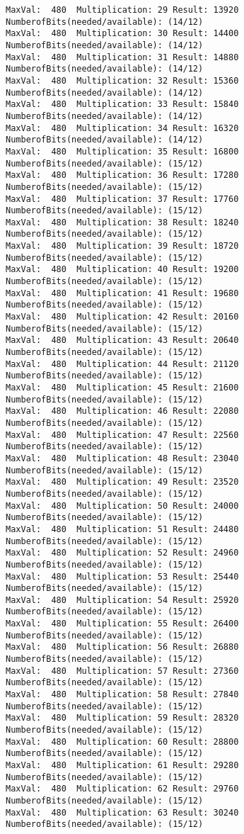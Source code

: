 \documentclass{article}
\begin{document}
\begin{Verbatim}[commandchars=\\\{\}]
MaxVal:  480  Multiplication: 29 Result: 13920 NumberofBits(needed/available): (14/12)
MaxVal:  480  Multiplication: 30 Result: 14400 NumberofBits(needed/available): (14/12)
MaxVal:  480  Multiplication: 31 Result: 14880 NumberofBits(needed/available): (14/12)
MaxVal:  480  Multiplication: 32 Result: 15360 NumberofBits(needed/available): (14/12)
MaxVal:  480  Multiplication: 33 Result: 15840 NumberofBits(needed/available): (14/12)
MaxVal:  480  Multiplication: 34 Result: 16320 NumberofBits(needed/available): (14/12)
MaxVal:  480  Multiplication: 35 Result: 16800 NumberofBits(needed/available): (15/12)
MaxVal:  480  Multiplication: 36 Result: 17280 NumberofBits(needed/available): (15/12)
MaxVal:  480  Multiplication: 37 Result: 17760 NumberofBits(needed/available): (15/12)
MaxVal:  480  Multiplication: 38 Result: 18240 NumberofBits(needed/available): (15/12)
MaxVal:  480  Multiplication: 39 Result: 18720 NumberofBits(needed/available): (15/12)
MaxVal:  480  Multiplication: 40 Result: 19200 NumberofBits(needed/available): (15/12)
MaxVal:  480  Multiplication: 41 Result: 19680 NumberofBits(needed/available): (15/12)
MaxVal:  480  Multiplication: 42 Result: 20160 NumberofBits(needed/available): (15/12)
MaxVal:  480  Multiplication: 43 Result: 20640 NumberofBits(needed/available): (15/12)
MaxVal:  480  Multiplication: 44 Result: 21120 NumberofBits(needed/available): (15/12)
MaxVal:  480  Multiplication: 45 Result: 21600 NumberofBits(needed/available): (15/12)
MaxVal:  480  Multiplication: 46 Result: 22080 NumberofBits(needed/available): (15/12)
MaxVal:  480  Multiplication: 47 Result: 22560 NumberofBits(needed/available): (15/12)
MaxVal:  480  Multiplication: 48 Result: 23040 NumberofBits(needed/available): (15/12)
MaxVal:  480  Multiplication: 49 Result: 23520 NumberofBits(needed/available): (15/12)
MaxVal:  480  Multiplication: 50 Result: 24000 NumberofBits(needed/available): (15/12)
MaxVal:  480  Multiplication: 51 Result: 24480 NumberofBits(needed/available): (15/12)
MaxVal:  480  Multiplication: 52 Result: 24960 NumberofBits(needed/available): (15/12)
MaxVal:  480  Multiplication: 53 Result: 25440 NumberofBits(needed/available): (15/12)
MaxVal:  480  Multiplication: 54 Result: 25920 NumberofBits(needed/available): (15/12)
MaxVal:  480  Multiplication: 55 Result: 26400 NumberofBits(needed/available): (15/12)
MaxVal:  480  Multiplication: 56 Result: 26880 NumberofBits(needed/available): (15/12)
MaxVal:  480  Multiplication: 57 Result: 27360 NumberofBits(needed/available): (15/12)
MaxVal:  480  Multiplication: 58 Result: 27840 NumberofBits(needed/available): (15/12)
MaxVal:  480  Multiplication: 59 Result: 28320 NumberofBits(needed/available): (15/12)
MaxVal:  480  Multiplication: 60 Result: 28800 NumberofBits(needed/available): (15/12)
MaxVal:  480  Multiplication: 61 Result: 29280 NumberofBits(needed/available): (15/12)
MaxVal:  480  Multiplication: 62 Result: 29760 NumberofBits(needed/available): (15/12)
MaxVal:  480  Multiplication: 63 Result: 30240 NumberofBits(needed/available): (15/12)
    \end{Verbatim}
\end{document}
